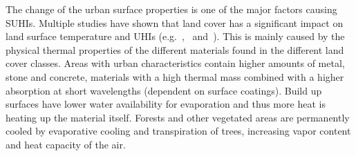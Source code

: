 \documentclass[12pt,a4paper, english,twoside]{scrartcl}
\begin{document}
      The change of the urban surface properties is one of the major factors causing \glspl{SUHI}.  
      Multiple studies have shown that land cover has a significant impact on land surface temperature and \glspl{UHI} (e.g.~\cite{Karakus2019},~\cite{Weng2004} and~\cite{Stewart2011}). 
      This is mainly caused by the physical thermal properties of the different materials found in the different land cover classes. 
      Areas with urban characteristics contain higher amounts of metal, stone and concrete, materials with a high thermal mass combined with a higher absorption at short wavelengths (dependent on surface coatings).  
      Build up surfaces have lower water availability for evaporation and thus more heat is heating up the material itself.
      Forests and other vegetated areas are permanently cooled by evaporative cooling and transpiration of trees, increasing vapor content and heat capacity of the air.
\end{document}
